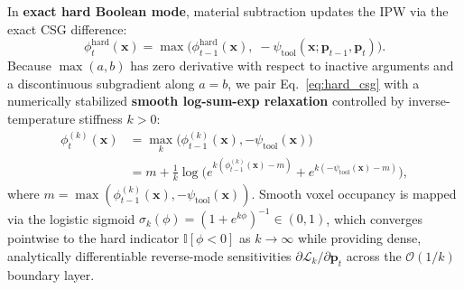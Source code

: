 \documentclass[conference]{IEEEtran}
\begin{document}
In \textbf{exact hard Boolean mode}, material subtraction updates the IPW via the exact CSG difference:
\begin{equation}
  \phi_t^{\text{hard}}(\mathbf{x}) = \max\!\big(\phi_{t-1}^{\text{hard}}(\mathbf{x}),\; -\psi_{\text{tool}}(\mathbf{x}; \mathbf{p}_{t-1}, \mathbf{p}_t)\big).
  \label{eq:hard_csg}
\end{equation}
Because $\max(a,b)$ has zero derivative with respect to inactive arguments and a discontinuous subgradient along $a = b$, we pair Eq.~\eqref{eq:hard_csg} with a numerically stabilized \textbf{smooth log-sum-exp relaxation} controlled by inverse-temperature stiffness $k > 0$:
\begin{equation}
  \begin{aligned}
    \phi_t^{(k)}(\mathbf{x}) &= \max_k\!\big(\phi_{t-1}^{(k)}(\mathbf{x}), -\psi_{\text{tool}}(\mathbf{x})\big) \\
    &= m + \frac{1}{k}\log\!\Big(e^{k(\phi_{t-1}^{(k)}(\mathbf{x}) - m)} + e^{k(-\psi_{\text{tool}}(\mathbf{x}) - m)}\Big),
  \end{aligned}
  \label{eq:soft_csg}
\end{equation}
where $m = \max(\phi_{t-1}^{(k)}(\mathbf{x}), -\psi_{\text{tool}}(\mathbf{x}))$. Smooth voxel occupancy is mapped via the logistic sigmoid $\sigma_k(\phi) = (1 + e^{k\phi})^{-1} \in (0,1)$, which converges pointwise to the hard indicator $\mathbb{I}[\phi < 0]$ as $k \to \infty$ while providing dense, analytically differentiable reverse-mode sensitivities $\partial \mathcal{L}_k / \partial \mathbf{p}_t$ across the $\mathcal{O}(1/k)$ boundary layer.
\end{document}
